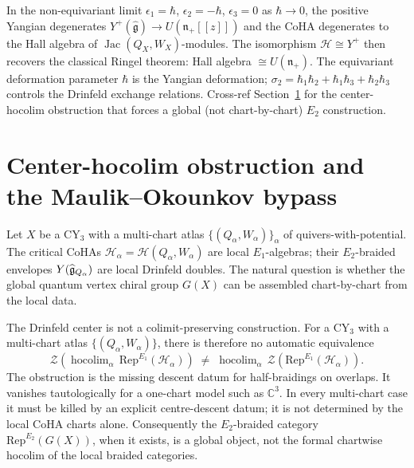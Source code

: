 \begin{remark}
\label{rem:thy-coha-classical-limit}
In the non-equivariant limit $\epsilon_1 = \hbar$, $\epsilon_2 =
-\hbar$, $\epsilon_3 = 0$ as $\hbar\to 0$, the positive Yangian
degenerates $Y^+(\widehat{\mathfrak{g}}) \to U(\mathfrak{n}_+[\![z]\!])$
and the CoHA degenerates to the Hall algebra of
$\operatorname{Jac}(Q_X, W_X)$-modules. The isomorphism
$\mathcal{H} \cong Y^+$ then recovers the classical Ringel theorem:
Hall algebra $\cong U(\mathfrak{n}_+)$. The equivariant deformation
parameter $\hbar$ is the Yangian deformation; $\sigma_2 =
\hbar_1\hbar_2 + \hbar_1\hbar_3 + \hbar_2\hbar_3$ controls the
Drinfeld exchange relations. Cross-ref
Section~\ref{sec:thy-6dhcs-center-hocolim} for the center-hocolim
obstruction that forces a global (not chart-by-chart) $E_2$ construction.
\end{remark}

\section{Center-hocolim obstruction and the Maulik--Okounkov bypass}
\label{sec:thy-6dhcs-center-hocolim}

Let $X$ be a $\mathrm{CY}_3$ with a multi-chart atlas
$\{(Q_\alpha, W_\alpha)\}_\alpha$ of quivers-with-potential. The
critical CoHAs $\mathcal{H}_\alpha = \mathcal{H}(Q_\alpha, W_\alpha)$
are local $E_1$-algebras; their $E_2$-braided envelopes $Y(\widehat{%
\mathfrak{g}}_{Q_\alpha})$ are local Drinfeld doubles. The natural
question is whether the global quantum vertex chiral group $G(X)$ can
be assembled chart-by-chart from the local data.

\begin{proposition}
\label{prop:thy-6dhcs-center-hocolim}
The Drinfeld center is not a colimit-preserving construction. For a
\(\mathrm{CY}_3\) with a multi-chart atlas
\(\{(Q_\alpha,W_\alpha)\}\), there is therefore no automatic
equivalence
\[
 \mathcal{Z}\!\left(
 \operatorname{hocolim}_\alpha\,
 \mathrm{Rep}^{E_1}(\mathcal{H}_\alpha)
 \right)
 \;\neq\;
 \operatorname{hocolim}_\alpha\,
 \mathcal{Z}\!\left(
 \mathrm{Rep}^{E_1}(\mathcal{H}_\alpha)
 \right).
\]
The obstruction is the missing descent datum for half-braidings on
overlaps. It vanishes tautologically for a one-chart model such as
\(\mathbb C^3\). In every multi-chart case it must be killed by an
explicit centre-descent datum; it is not determined by the local CoHA
charts alone. Consequently the \(E_2\)-braided category
\(\mathrm{Rep}^{E_2}(G(X))\), when it exists, is a global object, not the
formal chartwise hocolim of the local braided categories.
\end{proposition}

